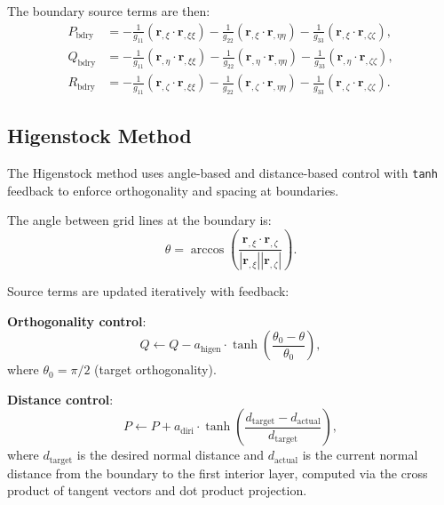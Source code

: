 \documentclass[11pt,a4paper]{report}
\newcommand{\rvec}{\bm{r}}
\begin{document}
The boundary source terms are then:
\begin{equation}
\begin{aligned}
    P_{\text{bdry}} &= -\frac{1}{g_{11}} (\rvec_{,\xi} \cdot \rvec_{,\xi\xi}) - \frac{1}{g_{22}} (\rvec_{,\xi} \cdot \rvec_{,\eta\eta}) - \frac{1}{g_{33}} (\rvec_{,\xi} \cdot \rvec_{,\zeta\zeta}), \\
    Q_{\text{bdry}} &= -\frac{1}{g_{11}} (\rvec_{,\eta} \cdot \rvec_{,\xi\xi}) - \frac{1}{g_{22}} (\rvec_{,\eta} \cdot \rvec_{,\eta\eta}) - \frac{1}{g_{33}} (\rvec_{,\eta} \cdot \rvec_{,\zeta\zeta}), \\
    R_{\text{bdry}} &= -\frac{1}{g_{11}} (\rvec_{,\zeta} \cdot \rvec_{,\xi\xi}) - \frac{1}{g_{22}} (\rvec_{,\zeta} \cdot \rvec_{,\eta\eta}) - \frac{1}{g_{33}} (\rvec_{,\zeta} \cdot \rvec_{,\zeta\zeta}).
\end{aligned}
\end{equation}

\subsection{Higenstock Method}

The Higenstock method uses angle-based and distance-based control with \texttt{tanh} feedback to enforce orthogonality and spacing at boundaries.

The angle between grid lines at the boundary is:
\begin{equation}
    \theta = \arccos\left( \frac{\rvec_{,\xi} \cdot \rvec_{,\zeta}}{|\rvec_{,\xi}| |\rvec_{,\zeta}|} \right).
\end{equation}

Source terms are updated iteratively with feedback:

\textbf{Orthogonality control}:
\begin{equation}
    Q \leftarrow Q - a_{\text{higen}} \cdot \tanh\left( \frac{\theta_0 - \theta}{\theta_0} \right),
\end{equation}
where $\theta_0 = \pi/2$ (target orthogonality).

\textbf{Distance control}:
\begin{equation}
    P \leftarrow P + a_{\text{diri}} \cdot \tanh\left( \frac{d_{\text{target}} - d_{\text{actual}}}{d_{\text{target}}} \right),
\end{equation}
where $d_{\text{target}}$ is the desired normal distance and $d_{\text{actual}}$ is the current normal distance from the boundary to the first interior layer, computed via the cross product of tangent vectors and dot product projection.
\end{document}
